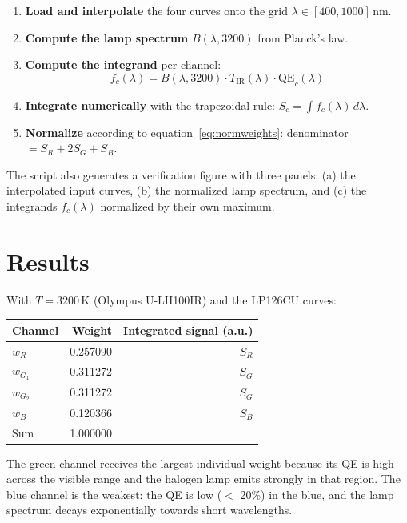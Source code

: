 \documentclass[11pt, a4paper]{article}
\begin{document}
\begin{enumerate}
  \item \textbf{Load and interpolate} the four curves onto the grid
        $\lambda \in [400, 1000]$\,nm.
  \item \textbf{Compute the lamp spectrum} $B(\lambda, 3200)$ from
        Planck's law.
  \item \textbf{Compute the integrand} per channel:
        \begin{equation}
          f_c(\lambda) = B(\lambda, 3200)\cdot T_{\mathrm{IR}}(\lambda)
                        \cdot \mathrm{QE}_c(\lambda)
        \end{equation}
  \item \textbf{Integrate numerically} with the trapezoidal rule:
        $S_c = \int f_c(\lambda)\,d\lambda$.
  \item \textbf{Normalize} according to equation~\eqref{eq:normweights}:
        denominator $= S_R + 2S_G + S_B$.
\end{enumerate}

The script also generates a verification figure with three panels:
(a) the interpolated input curves, (b) the normalized lamp spectrum,
and (c) the integrands $f_c(\lambda)$ normalized by their own maximum.

\section{Results}

With $T = 3200$\,K (Olympus U-LH100IR) and the LP126CU curves:

\begin{center}
\begin{tabular}{lrr}
\toprule
\textbf{Channel} & \textbf{Weight} & \textbf{Integrated signal (a.u.)} \\
\midrule
$w_R$             & 0.257090 & $S_R$ \\
$w_{G_1}$         & 0.311272 & $S_G$ \\
$w_{G_2}$         & 0.311272 & $S_G$ \\
$w_B$             & 0.120366 & $S_B$ \\
\midrule
Sum               & 1.000000 & \\
\bottomrule
\end{tabular}
\end{center}

The green channel receives the largest individual weight because its QE
is high across the visible range and the halogen lamp emits strongly in
that region. The blue channel is the weakest: the QE is low ($<$ 20\%)
in the blue, and the lamp spectrum decays exponentially towards short
wavelengths.
\end{document}
